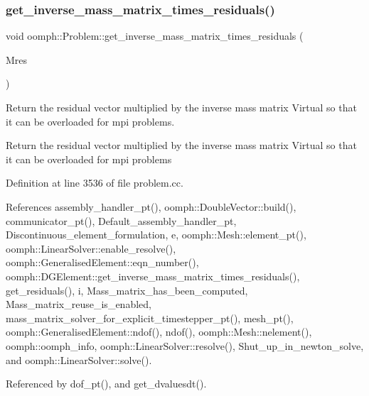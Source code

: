 \subsubsection{\texorpdfstring{get\+\_\+inverse\+\_\+mass\+\_\+matrix\+\_\+times\+\_\+residuals()}{get\_inverse\_mass\_matrix\_times\_residuals()}}
{\footnotesize\ttfamily void oomph\+::\+Problem\+::get\+\_\+inverse\+\_\+mass\+\_\+matrix\+\_\+times\+\_\+residuals (\begin{DoxyParamCaption}\item[{\hyperlink{classoomph_1_1DoubleVector}{Double\+Vector} \&}]{Mres }\end{DoxyParamCaption})\hspace{0.3cm}{\ttfamily [virtual]}}



Return the residual vector multiplied by the inverse mass matrix Virtual so that it can be overloaded for mpi problems. 

Return the residual vector multiplied by the inverse mass matrix Virtual so that it can be overloaded for mpi problems 

Definition at line 3536 of file problem.\+cc.



References assembly\+\_\+handler\+\_\+pt(), oomph\+::\+Double\+Vector\+::build(), communicator\+\_\+pt(), Default\+\_\+assembly\+\_\+handler\+\_\+pt, Discontinuous\+\_\+element\+\_\+formulation, e, oomph\+::\+Mesh\+::element\+\_\+pt(), oomph\+::\+Linear\+Solver\+::enable\+\_\+resolve(), oomph\+::\+Generalised\+Element\+::eqn\+\_\+number(), oomph\+::\+D\+G\+Element\+::get\+\_\+inverse\+\_\+mass\+\_\+matrix\+\_\+times\+\_\+residuals(), get\+\_\+residuals(), i, Mass\+\_\+matrix\+\_\+has\+\_\+been\+\_\+computed, Mass\+\_\+matrix\+\_\+reuse\+\_\+is\+\_\+enabled, mass\+\_\+matrix\+\_\+solver\+\_\+for\+\_\+explicit\+\_\+timestepper\+\_\+pt(), mesh\+\_\+pt(), oomph\+::\+Generalised\+Element\+::ndof(), ndof(), oomph\+::\+Mesh\+::nelement(), oomph\+::oomph\+\_\+info, oomph\+::\+Linear\+Solver\+::resolve(), Shut\+\_\+up\+\_\+in\+\_\+newton\+\_\+solve, and oomph\+::\+Linear\+Solver\+::solve().



Referenced by dof\+\_\+pt(), and get\+\_\+dvaluesdt().

\mbox{\label{classoomph_1_1Problem_a4ba83bbea19db3a530539f3e9f88a7e4}} 
